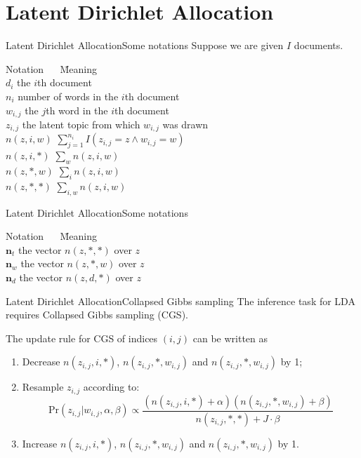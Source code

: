 \documentclass{beamer}
\renewcommand{\vec}{\mathbf}
\begin{document}
  \section{Latent Dirichlet Allocation}
  \begin{frame}{Latent Dirichlet Allocation}{Some notations}
    Suppose we are given $I$ documents.
    \begin{tabbing}
      Notation $\quad$ \=  Meaning \\
      $d_i$ \> the $i$th document \\
      $n_i$ \> number of words in the $i$th document \\
      $w_{i, j}$ \> the $j$th word in the $i$th document \\
      $z_{i, j}$ \> the latent topic from which $w_{i, j}$ was drawn \\
      $n(z, i, w)$ \> $\sum_{j = 1}^{n_i} I(z_{i, j} = z \wedge w_{i, j} = w) $ \\
      $n(z, i, *)$ \> $\sum_{w} n(z, i, w)$ \\
      $n(z, *, w)$ \> $\sum_{i} n(z, i, w)$ \\
      $n(z, *, *)$ \> $\sum_{i, w} n(z, i, w)$
    \end{tabbing}
  \end{frame}

  \begin{frame}{Latent Dirichlet Allocation}{Some notations}
    \begin{tabbing}
      Notation $\quad$ \=  Meaning \\
      $\vec{n}_t$ \> the vector $n(z, *, *)$ over $z$ \\
      $\vec{n}_w$ \> the vector $n(z, *, w)$ over $z$ \\
      $\vec{n}_d$ \> the vector $n(z, d, *)$ over $z$
    \end{tabbing}
  \end{frame}

  \begin{frame}{Latent Dirichlet Allocation}{Collapsed Gibbs sampling}
    The inference task for LDA requires Collapsed Gibbs sampling (CGS). \par
    \pause
    The update rule for CGS of indices $(i, j)$ can be written as
    \begin{enumerate}
      \item Decrease $n(z_{i, j}, i, *)$, $n(z_{i, j}, *, w_{i, j})$ and $n(z_{i, j}, *, w_{i, j})$ by 1;
      \item Resample $z_{i,j}$ according to:
      $$ \text{Pr}(z_{i, j} | w_{i, j}, \alpha, \beta) \propto \frac{(n(z_{i,j},i,*)+\alpha)(n(z_{i,j},*,w_{i,j})+\beta)}{n(z_{i,j}, *, *) + J \cdot \beta} $$
      \item Increase $n(z_{i, j}, i, *)$, $n(z_{i, j}, *, w_{i, j})$ and $n(z_{i, j}, *, w_{i, j})$ by 1.
    \end{enumerate}
  \end{frame}
\end{document}
